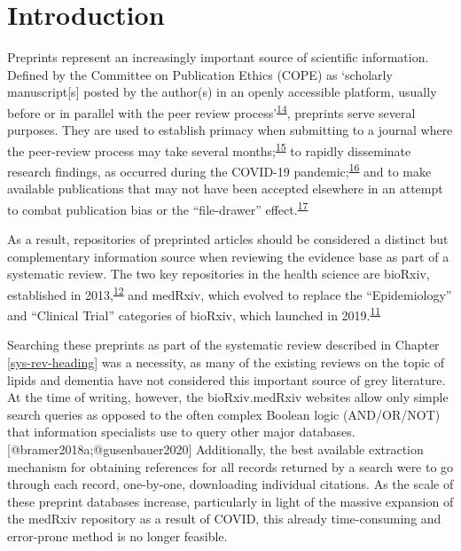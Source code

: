 \documentclass[a4paper, twoside]{templates/ociamthesis}
\begin{document}
\hypertarget{introduction-1}{%
\section{Introduction}\label{introduction-1}}

Preprints represent an increasingly important source of scientific information. Defined by the Committee on Publication Ethics (COPE) as `scholarly manuscript{[}s{]} posted by the author(s) in an openly accessible platform, usually before or in parallel with the peer review process'\textsuperscript{\protect\hyperlink{ref-committeeonpublicationethicscope2018}{14}}, preprints serve several purposes. They are used to establish primacy when submitting to a journal where the peer-review process may take several months;\textsuperscript{\protect\hyperlink{ref-vale2016}{15}} to rapidly disseminate research findings, as occurred during the COVID-19 pandemic;\textsuperscript{\protect\hyperlink{ref-fraser2020a}{16}} and to make available publications that may not have been accepted elsewhere in an attempt to combat publication bias or the ``file-drawer'' effect.\textsuperscript{\protect\hyperlink{ref-rosenthal1979}{17}}

As a result, repositories of preprinted articles should be considered a distinct but complementary information source when reviewing the evidence base as part of a systematic review. The two key repositories in the health science are bioRxiv, established in 2013,\textsuperscript{\protect\hyperlink{ref-sever2019}{12}} and medRxiv, which evolved to replace the ``Epidemiology'' and ``Clinical Trial'' categories of bioRxiv, which launched in 2019.\textsuperscript{\protect\hyperlink{ref-rawlinson2019}{11}}

Searching these preprints as part of the systematic review described in Chapter \ref{sys-rev-heading} was a necessity, as many of the existing reviews on the topic of lipids and dementia have not considered this important source of grey literature. At the time of writing, however, the bioRxiv.medRxiv websites allow only simple search queries as opposed to the often complex Boolean logic (AND/OR/NOT) that information specialists use to query other major databases.{[}@bramer2018a;@gusenbauer2020{]} Additionally, the best available extraction mechanism for obtaining references for all records returned by a search were to go through each record, one-by-one, downloading individual citations. As the scale of these preprint databases increase, particularly in light of the massive expansion of the medRxiv repository as a result of COVID, this already time-consuming and error-prone method is no longer feasible.
\end{document}

